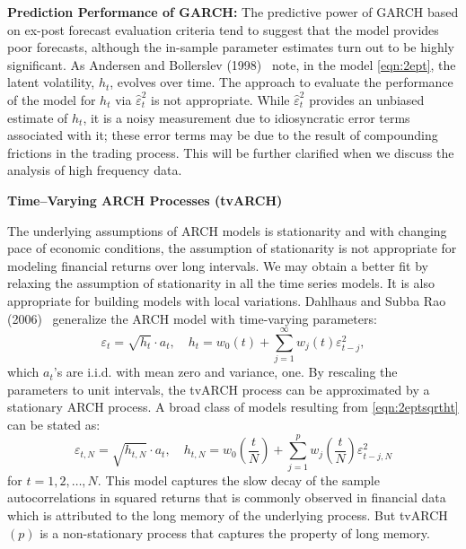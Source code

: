 \noindent\textbf{Prediction Performance of GARCH:} \label{in:forecast2} The predictive power of GARCH based on ex-post forecast evaluation criteria tend to suggest that the model provides poor forecasts, although the in-sample parameter estimates turn out to be highly significant. As Andersen and Bollerslev (1998)~\cite{andersen1998} note, in the model \eqref{eqn:2ept}, the latent volatility, $h_t$, evolves over time. The approach to evaluate the performance of the model for $h_t$ via $\hat{\varepsilon}_t^2$ is not appropriate. While $\hat{\varepsilon}_t^2$ provides an unbiased estimate of $h_t$, it is a noisy measurement due to idiosyncratic error terms associated with it; these error terms may be due to the result of compounding frictions in the trading process. This will be further clarified when we discuss the analysis of high frequency data. \twomedskip



\pagebreak



\noindent \textbf{Time--Varying ARCH Processes (tvARCH)} \label{in:tvarch} \twomedskip


The underlying assumptions of ARCH models is stationarity and with changing pace of economic conditions, the assumption of stationarity is not appropriate for modeling financial returns over long intervals. We may obtain a better fit by relaxing the assumption of stationarity in all the time series models. It is also appropriate for building models with local variations. Dahlhaus and Subba Rao (2006)~\cite{dahlhaus2006} generalize the ARCH model with time-varying parameters:
	\begin{equation} \label{eqn:2eptsqrtht}
	\varepsilon_t = \sqrt{h_t}\cdot a_t, \quad h_t = w_0(t) + \sum_{j=1}^{\infty} w_j(t) \varepsilon_{t-j}^2,
	\end{equation}
which $a_t$'s are i.i.d. with mean zero and variance, one. By rescaling the parameters to unit intervals, the tvARCH process can be approximated by a stationary ARCH process. A broad class of models resulting from \eqref{eqn:2eptsqrtht} can be stated as:
	\begin{equation} \label{eqn:2eptN}
	\varepsilon_{t,N} = \sqrt{h_{t,N}} \cdot a_t, \quad h_{t,N} = w_0 \left( \frac{t}{N} \right) + \sum_{j=1}^pw_j \left (\frac{t}{N} \right) \varepsilon_{t-j,N}^2
	\end{equation}
for $t= 1, 2, \ldots, N$. This model captures the slow decay of the sample autocorrelations in squared returns that is commonly observed in financial data which is attributed to the long memory of the underlying process. But tvARCH$(p)$ is a non-stationary process that captures the property of long memory.



